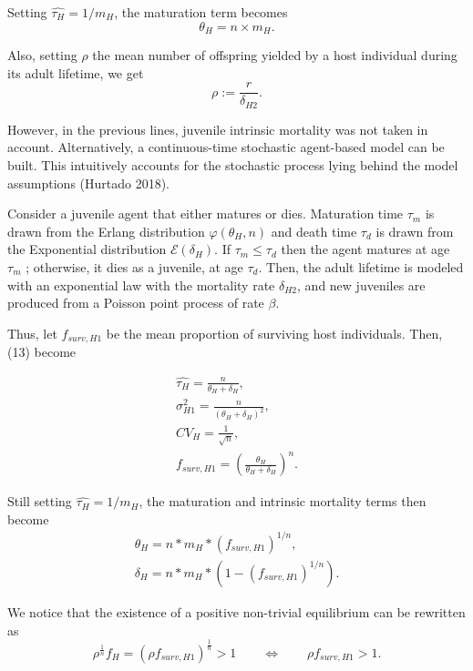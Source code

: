 \documentclass[12pt,a4paper,onecolumn]{article}
\begin{document}
Setting  $\hat{\tau_{H}} = 1/m_H$, the maturation term becomes
\begin{equation}
\theta_H = n \times m_H.
\end{equation}

Also, setting $\rho$ the mean number of offspring yielded by a host individual during its adult lifetime, we get 
\begin{equation}
\rho := \frac{r}{\delta_{H2}}.
\end{equation}

However, in the previous lines, juvenile intrinsic mortality was not taken in account. Alternatively, a continuous-time stochastic agent-based model can be built. This intuitively accounts for the stochastic process lying behind the model assumptions (Hurtado 2018).

Consider a juvenile agent that either matures or dies. Maturation time $\tau_m$ is drawn from the Erlang distribution $\varphi(\theta_H, n)$ and death time $\tau_d$ is drawn from the Exponential distribution $\mathcal{E}(\delta_H)$. If $\tau_m \leq \tau_d$ then the agent matures at age $\tau_m$ ; otherwise, it dies as a juvenile, at age $\tau_d$. Then, the adult lifetime is modeled with an exponential law with the mortality rate $\delta_{H2}$, and new juveniles are produced from a Poisson point process of rate $\beta$.

Thus, let $f_{surv,H1}$ be the mean proportion of surviving host individuals. Then, (13) become 

\begin{align}
\hat{\tau_{H}} = \frac{n}{\theta_{H} + \delta_{H}}, \nonumber \\
\sigma^2_{H1} = \frac{n}{(\theta_{H} + \delta_{H})^2}, \\
CV_{H} = \frac{1}{\sqrt{n}}, \\
f_{surv,H1} = (\frac{\theta_{H}}{\theta_{H} + \delta_{H}})^n.
\end{align}

Still setting $\hat{\tau_{H}} = 1/m_H$, the maturation and intrinsic mortality terms then become 
\begin{equation}
\begin{alignedat}{2}
\theta_{H} = n * m_{H}* (f_{surv,H1})^{1/n}, \\
\delta_{H} = n* m_{H}* (1-(f_{surv,H1})^{1/n}).
\end{alignedat}
\end{equation}

We notice that the existence of a positive non-trivial equilibrium can be rewritten as 
$$\rho^{\frac{1}{n}}f_H = (\rho f_{surv,H1})^{\frac{1}{n}} > 1 \qquad \iff \qquad \rho f_{surv,H1} > 1.$$
\end{document}

